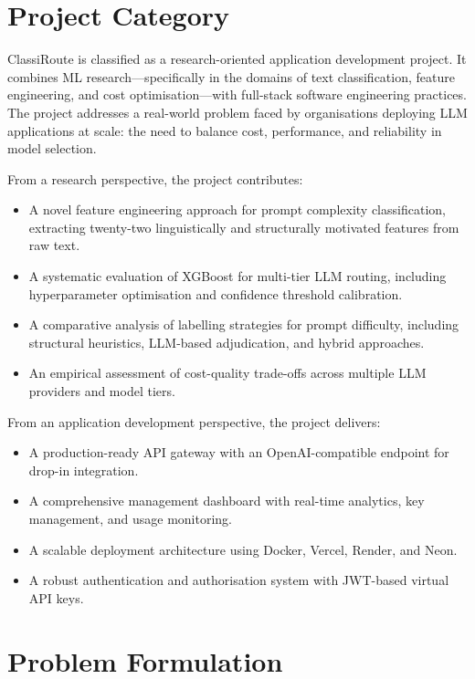 \documentclass[oneside,12pt,a4paper]{report}
\begin{document}
\section{Project Category}

ClassiRoute is classified as a research-oriented application development project. It combines ML research---specifically in the domains of text classification, feature engineering, and cost optimisation---with full-stack software engineering practices. The project addresses a real-world problem faced by organisations deploying LLM applications at scale: the need to balance cost, performance, and reliability in model selection.

From a research perspective, the project contributes:
\begin{itemize}
  \item A novel feature engineering approach for prompt complexity classification, extracting twenty-two linguistically and structurally motivated features from raw text.
  \item A systematic evaluation of XGBoost for multi-tier LLM routing, including hyperparameter optimisation and confidence threshold calibration.
  \item A comparative analysis of labelling strategies for prompt difficulty, including structural heuristics, LLM-based adjudication, and hybrid approaches.
  \item An empirical assessment of cost-quality trade-offs across multiple LLM providers and model tiers.
\end{itemize}

From an application development perspective, the project delivers:
\begin{itemize}
  \item A production-ready API gateway with an OpenAI-compatible endpoint for drop-in integration.
  \item A comprehensive management dashboard with real-time analytics, key management, and usage monitoring.
  \item A scalable deployment architecture using Docker, Vercel, Render, and Neon.
  \item A robust authentication and authorisation system with JWT-based virtual API keys.
\end{itemize}

\section{Problem Formulation}
\end{document}
